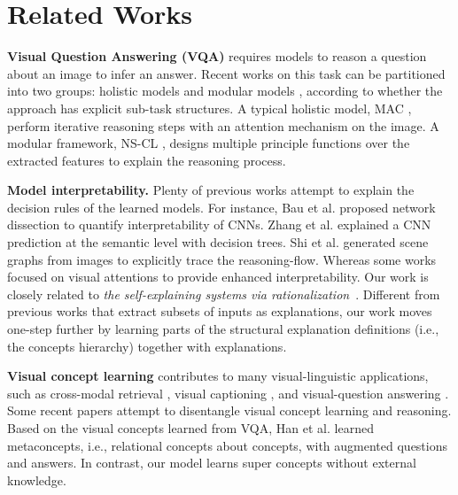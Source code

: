\documentclass[final]{cvpr}
\begin{document}
\section{Related Works}
\textbf{Visual Question Answering (VQA)} requires models to reason a question about an image to infer an answer. Recent works on this task can be partitioned into two groups: holistic models \cite{yang2016stacked, xu2016ask, anderson2018bottom, perez2018film, hudson2018compositional} and modular models \cite{andreas2016learning, andreas2016neural, hu2017learning, johnson2017inferring, hu2018explainable, yi2018neural, mao2018neuro}, according to whether the approach has explicit sub-task structures. A typical holistic model, MAC \cite{hudson2018compositional}, perform iterative reasoning steps with an attention mechanism on the image.  A modular framework, NS-CL \cite{mao2018neuro}, designs multiple principle functions over the extracted features to explain the reasoning process. 


\textbf{Model interpretability.} Plenty of previous works attempt to explain the decision rules of the learned models. For instance, Bau et al. \cite{bau2017network} proposed network dissection to quantify interpretability of CNNs. Zhang et al. \cite{zhang2019interpreting} explained a CNN prediction at the semantic level with decision trees. Shi et al. \cite{shi2019explainable} generated scene graphs from images to explicitly trace the reasoning-flow. 
Whereas some works \cite{park2016attentive, hu2018explainable} focused on visual attentions to provide enhanced interpretability. 
Our work is closely related to \emph{the self-explaining systems via rationalization}~\cite{lei2016rationalizing,chen2018learning,yu2019rethinking}. 
Different from previous works that extract subsets of inputs as explanations, our work moves one-step further by learning parts of the structural explanation definitions (i.e., the concepts hierarchy) together with explanations.

\textbf{Visual concept learning} contributes to many visual-linguistic applications, such as cross-modal retrieval \cite{kiros2014unifying}, visual captioning \cite{karpathy2015deep}, and visual-question answering \cite{malinowski2015ask, antol2015vqa}. Some recent papers \cite{yi2018neural, mao2018neuro} attempt to disentangle visual concept learning and reasoning. Based on the visual concepts learned from VQA, Han et al. \cite{han2019visual} learned metaconcepts, i.e., relational concepts about concepts, with augmented questions and answers. In contrast, our model learns super concepts without external knowledge.
\end{document}
